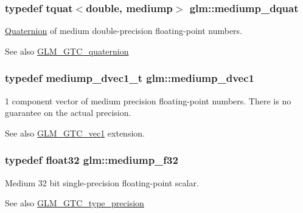 \subsubsection[{mediump\+\_\+dquat}]{\setlength{\rightskip}{0pt plus 5cm}typedef {\bf tquat}$<$double, mediump$>$ {\bf glm\+::mediump\+\_\+dquat}}\label{namespaceglm_ae5feb45196f5e0d2b4e61873a08771f5}
\hyperlink{class_quaternion}{Quaternion} of medium double-\/precision floating-\/point numbers.

\begin{DoxySeeAlso}{See also}
\hyperlink{group__gtc__quaternion}{G\+L\+M\+\_\+\+G\+T\+C\+\_\+quaternion} 
\end{DoxySeeAlso}
\hypertarget{namespaceglm_a3ccea36346bf8df6c1ebc56d43186dcd}{}
\subsubsection[{mediump\+\_\+dvec1}]{\setlength{\rightskip}{0pt plus 5cm}typedef mediump\+\_\+dvec1\+\_\+t {\bf glm\+::mediump\+\_\+dvec1}}\label{namespaceglm_a3ccea36346bf8df6c1ebc56d43186dcd}
1 component vector of medium precision floating-\/point numbers. There is no guarantee on the actual precision. \begin{DoxySeeAlso}{See also}
\hyperlink{group__gtc__vec1}{G\+L\+M\+\_\+\+G\+T\+C\+\_\+vec1} extension. 
\end{DoxySeeAlso}
\hypertarget{namespaceglm_a3dbba6bd06a546d7a11d1c09c2f04b1a}{}
\subsubsection[{mediump\+\_\+f32}]{\setlength{\rightskip}{0pt plus 5cm}typedef {\bf float32} {\bf glm\+::mediump\+\_\+f32}}\label{namespaceglm_a3dbba6bd06a546d7a11d1c09c2f04b1a}
Medium 32 bit single-\/precision floating-\/point scalar. \begin{DoxySeeAlso}{See also}
\hyperlink{group__gtc__type__precision}{G\+L\+M\+\_\+\+G\+T\+C\+\_\+type\+\_\+precision} 
\end{DoxySeeAlso}
\hypertarget{namespaceglm_a103735a38477f7c389b36aae0fbdf274}{}
